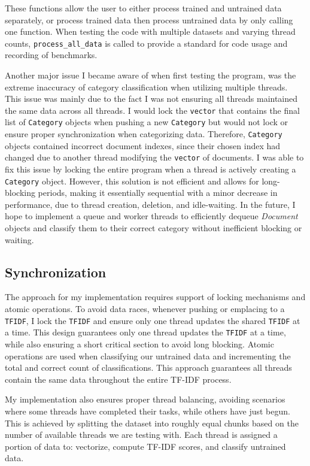 \documentclass[conference]{IEEEtran}
\newcommand{\code}[1]{\lstinline[basicstyle=\ttfamily]|#1|}
\begin{document}
These functions allow the user to either process trained and untrained data separately, or process trained data then process untrained data by only calling one function. When testing the code with multiple datasets and varying thread counts, \code{process_all_data} is called to provide a standard for code usage and recording of benchmarks.

Another major issue I became aware of when first testing the program, was the extreme inaccuracy of category classification when utilizing multiple threads. This issue was mainly due to the fact I was not ensuring all threads maintained the same data across all threads. I would lock the \code{vector} that contains the final list of \code{Category} objects when pushing a new \code{Category} but would not lock or ensure proper synchronization when categorizing data. Therefore, \code{Category} objects contained incorrect document indexes, since their chosen index had changed due to another thread modifying the \code{vector} of documents. I was able to fix this issue by locking the entire program when a thread is actively creating a \code{Category} object. However, this solution is not efficient and allows for long-blocking periods, making it essentially sequential with a minor decrease in performance, due to thread creation, deletion, and idle-waiting. In the future, I hope to implement a queue and worker threads to efficiently dequeue \textit{Document} objects and classify them to their correct category without inefficient blocking or waiting.

\subsection{Synchronization}
The approach for my implementation requires support of locking mechanisms and atomic operations. To avoid data races, whenever pushing or emplacing to a \code{TFIDF}, I lock the \code{TFIDF} and ensure only one thread updates the shared \code{TFIDF} at a time. This design guarantees only one thread updates the \code{TFIDF} at a time, while also ensuring a short critical section to avoid long blocking. Atomic operations are used when classifying our untrained data and incrementing the total and correct count of classifications. This approach guarantees all threads contain the same data throughout the entire TF-IDF process.

My implementation also ensures proper thread balancing, avoiding scenarios where some threads have completed their tasks, while others have just begun. This is achieved by splitting the dataset into roughly equal chunks based on the number of available threads we are testing with. Each thread is assigned a portion of data to: vectorize, compute TF-IDF scores, and classify untrained data.
\end{document}
